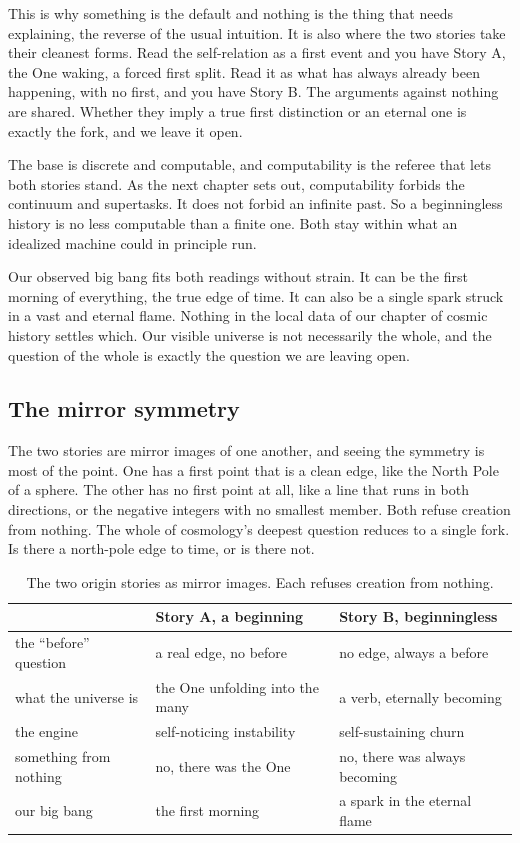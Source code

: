 This is why something is the default and nothing is the thing that needs explaining, the reverse of the usual
intuition. It is also where the two stories take their cleanest forms. Read the self-relation as a first event and
you have Story A, the One waking, a forced first split. Read it as what has always already been happening, with no
first, and you have Story B. The arguments against nothing are shared. Whether they imply a true first distinction
or an eternal one is exactly the fork, and we leave it open.

The base is discrete and computable, and computability is the referee that lets both stories stand. As the next
chapter sets out, computability forbids the continuum and supertasks. It does not forbid an infinite past. So a
beginningless history is no less computable than a finite one. Both stay within what an idealized machine could in
principle run.

Our observed big bang fits both readings without strain. It can be the first morning of everything, the true
edge of time. It can also be a single spark struck in a vast and eternal flame. Nothing in the local data of our
chapter of cosmic history settles which. Our visible universe is not necessarily the whole, and the question of
the whole is exactly the question we are leaving open.

\subsection{The mirror symmetry}

The two stories are mirror images of one another, and seeing the symmetry is most of the point. One has a first
point that is a clean edge, like the North Pole of a sphere. The other has no first point at all, like a line that
runs in both directions, or the negative integers with no smallest member. Both refuse creation from nothing. The
whole of cosmology's deepest question reduces to a single fork. Is there a north-pole edge to time, or is there
not.

\begin{table}[ht]
\centering
\begin{tabular}{@{}lll@{}}
\toprule
 & Story A, a beginning & Story B, beginningless \\
\midrule
the ``before'' question & a real edge, no before & no edge, always a before \\
what the universe is & the One unfolding into the many & a verb, eternally becoming \\
the engine & self-noticing instability & self-sustaining churn \\
something from nothing & no, there was the One & no, there was always becoming \\
our big bang & the first morning & a spark in the eternal flame \\
\bottomrule
\end{tabular}
\caption{The two origin stories as mirror images. Each refuses creation from nothing.}
\end{table}

